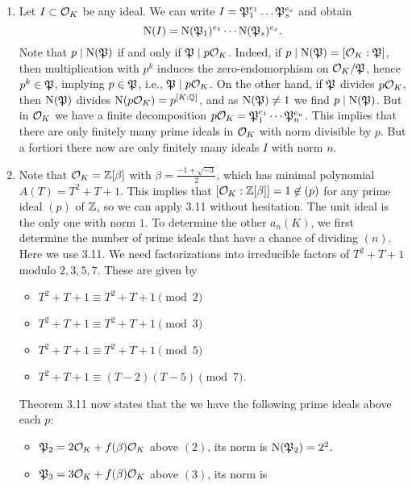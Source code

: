 \documentclass[a4paper,11pt]{article}
\begin{document}
\begin{enumerate}[labelindent=0pt, wide]
    \item Let $I \subset \mathcal{O}_K$ be any ideal. We can write $I = \mathfrak{P}_1^{e_1} \dots
        \mathfrak{P}_s^{e_s}$ and obtain $$\operatorname{N}(I) = \operatorname{N}(\mathfrak{P}_1)^{e_1} \cdots
        \operatorname{N}(\mathfrak{P}_s)^{e_s}.$$
        Note that $p \mid \operatorname{N}(\mathfrak{P})$ if and only if $\mathfrak{P} \mid p\mathcal{O}_K$. Indeed,
        if $p \mid \operatorname{N}(\mathfrak{P}) = [\mathcal{O}_K:\mathfrak{P}]$, then multiplication with $p^k$
        induces the zero-endomorphism on $\mathcal{O}_K/\mathfrak{P}$, hence $p^k \in \mathfrak{P}$,
        implying $p \in \mathfrak{P}$, i.e., $\mathfrak{P} \mid p\mathcal{O}_K$. 
        On the other hand, if $\mathfrak{P}$ divides $p\mathcal{O}_K$, then 
        $\operatorname{N}(\mathfrak{P})$ divides $\operatorname{N}(p\mathcal{O}_K) = p^{[K:\mathbb{Q}]}$, and as
        $\operatorname{N}(\mathfrak{P}) \neq 1$ we find $p \mid \operatorname{N}(\mathfrak{P})$. But 
        in $\mathcal{O}_K$ we have a finite decomposition $p \mathcal{O}_K = 
        \mathfrak{P}_1^{e_1} \cdots \mathfrak{P}_n^{e_n}$. This implies that there are only finitely
        many prime ideals in $\mathcal{O}_K$ with norm divisible by $p$. 
        But a fortiori there now are only finitely many ideals $I$ with norm
        $n$.
\item Note that $\mathcal{O}_K = \mathbb{Z}[\beta]$ with $\beta = \frac{-1+\sqrt{-3}}2$,
        which has minimal polynomial $A(T) = T^2 + T + 1$. This implies that
        $[\mathcal{O}_K:\mathbb{Z}[\beta]]=1\not \in (p)$ for any prime ideal $(p)$ of $\mathbb{Z}$, so
        we can apply 3.11 without hesitation. The unit ideal is the only one
        with norm $1$. To determine the other $a_n(K)$, we first determine the
        number of prime ideals that have a chance of dividing $(n)$. Here we use
        3.11. We need factorizations into irreducible factors of $T^2 + T + 1$
        modulo $2, 3, 5, 7$. These are given by
        \begin{itemize}
            \item $T^2 + T + 1 \equiv T^2 + T + 1\pmod 2$
            \item $T^2 + T + 1 \equiv T^2 + T + 1\pmod 3$
            \item $T^2 + T + 1 \equiv T^2 + T + 1\pmod 5$
            \item $T^2 + T + 1 \equiv (T-2)(T-5) \pmod 7$.
        \end{itemize}
        Theorem 3.11 now states that the we have the following prime ideals above
        each $p$:
        \begin{itemize}
            \item $\mathfrak{P}_2 = 2 \mathcal{O}_K + f(\beta) \mathcal{O}_K$ above $(2)$, its norm is 
                $\operatorname{N}(\mathfrak{P}_2) = 2^2$.
            \item $\mathfrak{P}_3 = 3 \mathcal{O}_K + f(\beta) \mathcal{O}_K$ above $(3)$, its norm is 

\end{itemize}
\end{enumerate}
\end{document}
